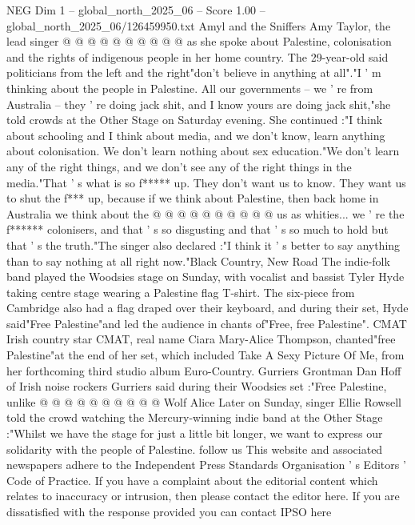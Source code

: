 \begin{textsample}{NEG Dim 1 – global\_north\_2025\_06 – Score 1.00 – global\_north\_2025\_06/126459950.txt}
Amyl and the Sniffers Amy Taylor, the lead singer @ @ @ @ @ @ @ @ @ @ as she spoke about Palestine, colonisation and the rights of indigenous people in her home country.
The 29-year-old said politicians from the left and the right"don't believe in anything at all"."I ' m thinking about the people in Palestine.
All our governments -- we ' re from Australia -- they ' re doing jack shit, and I know yours are doing jack shit,"she told crowds at the Other Stage on Saturday evening.
She continued :"I think about schooling and I think about media, and we don't know, learn anything about colonisation.
We don't learn nothing about sex education."We don't learn any of the right things, and we don't see any of the right things in the media."That ' s what is so f***** up.
They don't want us to know.
They want us to shut the f*** up, because if we think about Palestine, then back home in Australia we think about the @ @ @ @ @ @ @ @ @ @ us as whities... we ' re the f****** colonisers, and that ' s so disgusting and that ' s so much to hold but that ' s the truth."The singer also declared :"I think it ' s better to say anything than to say nothing at all right now."Black Country, New Road The indie-folk band played the Woodsies stage on Sunday, with vocalist and bassist Tyler Hyde taking centre stage wearing a Palestine flag T-shirt.
The six-piece from Cambridge also had a flag draped over their keyboard, and during their set, Hyde said"Free Palestine"and led the audience in chants of"Free, free Palestine".
CMAT Irish country star CMAT, real name Ciara Mary-Alice Thompson, chanted"free Palestine"at the end of her set, which included Take A Sexy Picture Of Me, from her forthcoming third studio album Euro-Country.
Gurriers Grontman Dan Hoff of Irish noise rockers Gurriers said during their Woodsies set :"Free Palestine, unlike @ @ @ @ @ @ @ @ @ @ Wolf Alice Later on Sunday, singer Ellie Rowsell told the crowd watching the Mercury-winning indie band at the Other Stage :"Whilst we have the stage for just a little bit longer, we want to express our solidarity with the people of Palestine. follow us This website and associated newspapers adhere to the Independent Press Standards Organisation ' s Editors ' Code of Practice.
If you have a complaint about the editorial content which relates to inaccuracy or intrusion, then please contact the editor here.
If you are dissatisfied with the response provided you can contact IPSO here

\end{textsample}

